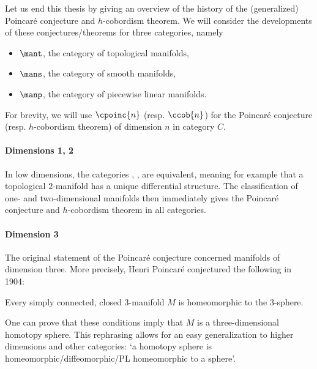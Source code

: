 Let us end this thesis by giving an overview of the history of the (generalized) Poincaré conjecture and $h$-cobordism theorem.
We will consider the developments of these conjectures/theorems for three categories, namely
\filbreak
\begin{itemize}
    \item $\mant$, the category of topological manifolds,
    \item $\mans$, the category of smooth manifolds,
    \item $\manp$, the category of piecewise linear manifolds.
\end{itemize}
For brevity, we will use $\cpoinc{n}$ (resp. $\ccob{n}$) for the Poincaré conjecture (resp. $h$-cobordism theorem) of dimension $n$ in category $C$.

\paragraph{Dimensions 1, 2}
In low dimensions, the categories \mans, \mant, \manp{} are equivalent, meaning for example that a topological $2$-manifold has a unique differential structure.
The classification of one- and two-dimensional manifolds then immediately gives the Poincaré conjecture and $h$-cobordism theorem in all categories.


\paragraph{Dimension 3}
The original statement of the Poincaré conjecture concerned manifolds of dimension three.
More precisely, Henri Poincaré conjectured the following in 1904:
\begin{theorem}
    Every simply connected, closed $3$-manifold $M$ is homeomorphic to the $3$-sphere.
\end{theorem}
One can prove that these conditions imply that $M$ is a three-dimensional homotopy sphere.
This rephrasing allows for an easy generalization to higher dimensions and other categories: `a homotopy sphere is homeomorphic/diffeomorphic/PL homeomorphic to a sphere'.

